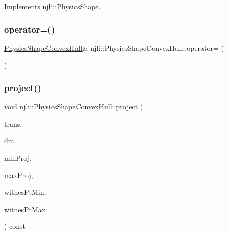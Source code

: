 Implements \mbox{\hyperlink{classnjli_1_1_physics_shape_a890d915f88af06dcf1ac1fa4f5943dc2}{njli\+::\+Physics\+Shape}}.

\mbox{\label{classnjli_1_1_physics_shape_convex_hull_a6fa6c108dece02f7076f7de56788fa58}} 
\subsubsection{\texorpdfstring{operator=()}{operator=()}}
{\footnotesize\ttfamily \mbox{\hyperlink{classnjli_1_1_physics_shape_convex_hull}{Physics\+Shape\+Convex\+Hull}}\& njli\+::\+Physics\+Shape\+Convex\+Hull\+::operator= (\begin{DoxyParamCaption}\item[{const \mbox{\hyperlink{classnjli_1_1_physics_shape_convex_hull}{Physics\+Shape\+Convex\+Hull}} \&}]{ }\end{DoxyParamCaption})\hspace{0.3cm}{\ttfamily [protected]}}

\mbox{\label{classnjli_1_1_physics_shape_convex_hull_a7fa7815ca0dcd22b8518e2800104494c}} 
\subsubsection{\texorpdfstring{project()}{project()}}
{\footnotesize\ttfamily \mbox{\hyperlink{_thread_8h_af1e856da2e658414cb2456cb6f7ebc66}{void}} njli\+::\+Physics\+Shape\+Convex\+Hull\+::project (\begin{DoxyParamCaption}\item[{const bt\+Transform \&}]{trans,  }\item[{const bt\+Vector3 \&}]{dir,  }\item[{bt\+Scalar \&}]{min\+Proj,  }\item[{bt\+Scalar \&}]{max\+Proj,  }\item[{bt\+Vector3 \&}]{witnes\+Pt\+Min,  }\item[{bt\+Vector3 \&}]{witnes\+Pt\+Max }\end{DoxyParamCaption}) const}

